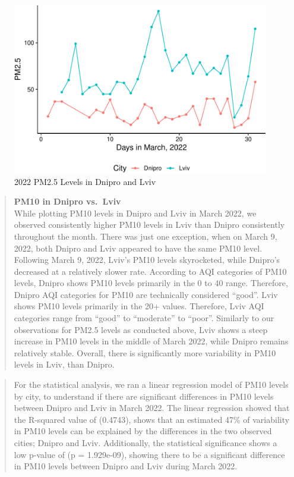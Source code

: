 \documentclass[
  12pt,
]{article}
\begin{document}
\newpage

\begin{figure}
\centering
\includegraphics{Fontanie_Gordon_Weinberg_Project_files/figure-latex/Plotting Lviv vs Dnipro PM25-1.pdf}
\caption{2022 PM2.5 Levels in Dnipro and Lviv}
\end{figure}

\newpage

\begin{quote}
\textbf{PM10 in Dnipro vs.~Lviv}\\
While plotting PM10 levels in Dnipro and Lviv in March 2022, we observed
consistently higher PM10 levels in Lviv than Dnipro consistently
throughout the month. There was just one exception, when on March 9,
2022, both Dnipro and Lviv appeared to have the same PM10 level.
Following March 9, 2022, Lviv's PM10 levels skyrocketed, while Dnipro's
decreased at a relatively slower rate. According to AQI categories of
PM10 levels, Dnipro shows PM10 levels primarily in the 0 to 40 range.
Therefore, Dnipro AQI categories for PM10 are technically considered
``good''. Lviv shows PM10 levels primarily in the 20+ values. Therefore,
Lviv AQI categories range from ``good'' to ``moderate'' to ``poor''.
Similarly to our observations for PM2.5 levels as conducted above, Lviv
shows a steep increase in PM10 levels in the middle of March 2022, while
Dnipro remains relatively stable. Overall, there is significantly more
variability in PM10 levels in Lviv, than Dnipro.
\end{quote}

\begin{quote}
For the statistical analysis, we ran a linear regression model of PM10
levels by city, to understand if there are significant differences in
PM10 levels between Dnipro and Lviv in March 2022. The linear regression
showed that the R-squared value of (0.4743), shows that an estimated
47\% of variability in PM10 levels can be explained by the differences
in the two observed cities; Dnipro and Lviv. Additionally, the
statistical significance shows a low p-value of (p = 1.929e-09), showing
there to be a significant difference in PM10 levels between Dnipro and
Lviv during March 2022.
\end{quote}
\end{document}
